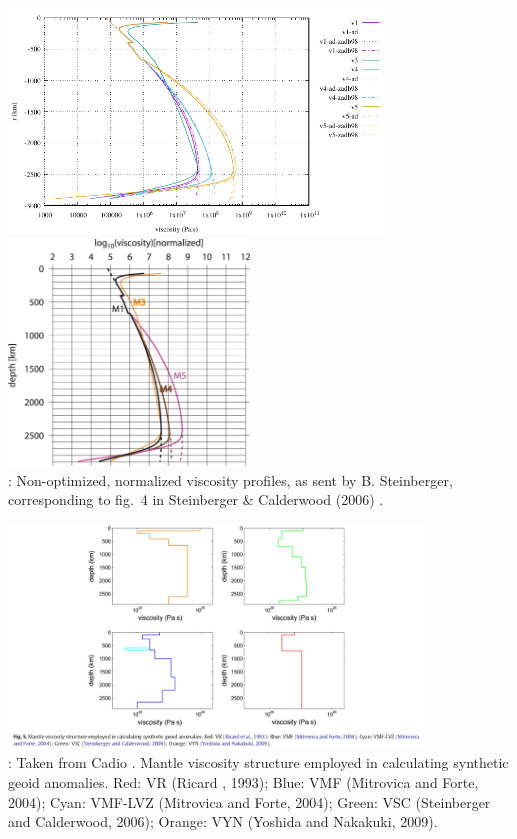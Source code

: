 \begin{center}
\includegraphics[height=6cm]{images/viscosity_profile/profiles_steinberger}
\includegraphics[height=6cm]{images/viscosity_profile/stca06-fig4}\\
{\captionfont \twothousandsix:
Non-optimized, normalized viscosity profiles, as sent by B. Steinberger,
corresponding to fig.~4 in Steinberger \& Calderwood (2006) \cite{stca06}.}
\end{center}


\begin{center}
\includegraphics[width=11cm]{images/viscosity_profile/capd11}\\
{\captionfont \twothousandeleven: Taken from Cadio \etal \cite{capd11}.
Mantle viscosity structure employed in calculating synthetic geoid anomalies. 
Red: VR (Ricard \etal, 1993); Blue: VMF (Mitrovica and Forte, 2004); Cyan: VMF-LVZ (Mitrovica
and Forte, 2004); Green: VSC (Steinberger and Calderwood, 2006); Orange: VYN (Yoshida and Nakakuki, 2009).}
\end{center}

